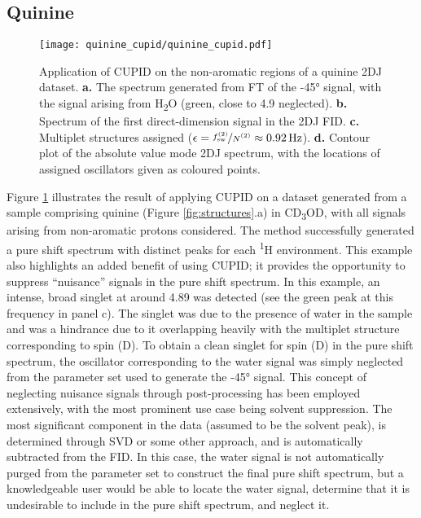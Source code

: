 \subsection{Quinine}
\begin{figure}
    \centering
    \texttt{[image: quinine\_cupid/quinine\_cupid.pdf]}
    \caption[
        Application of \acs{CUPID} on the non-aromatic regions of a quinine
        \acs{2DJ} dataset.
    ]{
        Application of \ac{CUPID} on the non-aromatic regions of a quinine
        \ac{2DJ} dataset.
        \textbf{a.} The spectrum generated from \ac{FT} of the \ang{-45}
        signal, with the signal arising from H\textsubscript{2}O (green, close
        to \qty{4.9}{\partspermillion} neglected).
        \textbf{b.} Spectrum of the first direct-dimension signal in the
        \ac{2DJ} \ac{FID}.
        \textbf{c.} Multiplet structures assigned ($\epsilon =
        \nicefrac{\fswtwo}{\Ntwo} \approx \qty{0.92}{\hertz}$).
        \textbf{d.} Contour plot of the absolute value mode \ac{2DJ} spectrum,
        with the locations of assigned oscillators given as coloured points.
    }
    \label{fig:quinine-cupid}
\end{figure}

Figure \ref{fig:quinine-cupid} illustrates the result of applying \ac{CUPID} on
a dataset generated from a sample comprising quinine (Figure
\ref{fig:structures}.a) in CD\textsubscript{3}OD,
with all signals arising from non-aromatic protons considered. The method
successfully generated a
pure shift spectrum with distinct peaks for each \textsuperscript{1}H
environment. This example also highlights an added benefit of using \ac{CUPID};
it provides the opportunity to suppress ``nuisance'' signals in the pure shift
spectrum. In this
example, an intense, broad singlet at around \qty{4.89}{\partspermillion}
was detected (see the green peak at this frequency in panel c).
The singlet was due to the presence of water in the sample and was a hindrance
due to it overlapping heavily with the multiplet structure corresponding to
spin (D). To obtain a clean singlet for spin (D) in the pure shift spectrum, the
oscillator corresponding to the water signal was simply neglected from
the parameter set used to generate the \ang{-45} signal. This concept of neglecting
nuisance signals through post-processing has been employed extensively, with
the most prominent use case being solvent suppression. The most
significant component in the data (assumed to be the solvent peak), is
determined through \ac{SVD} or some other approach, and is automatically
subtracted from the \ac{FID}\cite{Zhu1997}.
In this case, the water signal is not automatically purged from the parameter
set to construct the final pure shift spectrum, but a knowledgeable user would
be able to locate the water signal, determine that it is undesirable to include
in the pure shift spectrum, and neglect it.


